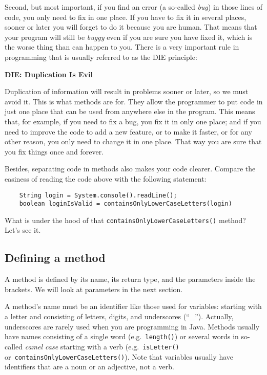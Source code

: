 Second, but most important, if you find an error (a so-called
\emph{bug}) in those lines of code, you only need to fix in one
place. If you have to fix it in several places, sooner or later you
will forget to do it because you are human. That means that your
program will still be \emph{buggy} even if you are sure you have fixed
it, which is the worse thing than can happen to you. There is a very
important rule in programming that is usually referred to as the DIE
principle: 

\begin{center}
\vspace{1cm}
\textbf{\large DIE: Duplication Is Evil}
\vspace{1cm}
\end{center}

Duplication of information will result in problems sooner or later, so
we must avoid it. This is what methods are for. They allow the
programmer to put code in just one place that can be used from
anywhere else in the program. This means that, for example, if you
need to fix a bug, you fix it in only one place; and if you need to
improve the code to add a new feature, or to make it faster, or for
any other reason, you only need to change it in one place. That way
you are sure that you fix things once and forever. 

Besides, separating code in methods also makes your code
clearer. Compare the easiness of reading the code above with the
following statement: 

\begin{verbatim}
    String login = System.console().readLine();
    boolean loginIsValid = containsOnlyLowerCaseLetters(login)
\end{verbatim}

What is under the hood of that \verb+containsOnlyLowerCaseLetters()+
method? Let's see it. 

\subsection{Defining a method}

A method is defined by its name, its return type, and the parameters
inside the brackets. We will look at parameters in the next section.

A method's name must be an identifier
like those used for variables: starting with a letter and consisting
of letters, digits, and underscores (``\_''). Actually, underscores
are rarely used when you are programming in Java. Methods
usually have names consisting of a single word
(e.g.~\verb+length()+) or several words in so-called \emph{camel case}
starting with a verb (e.g.~\verb+isLetter()+
or~\verb+containsOnlyLowerCaseLetters()+). Note that variables usually
have identifiers that are a noun or an adjective, not a verb.

